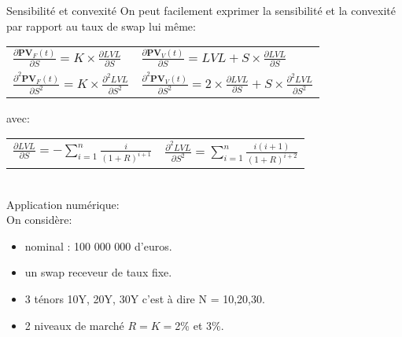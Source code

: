 \documentclass{beamer}
\begin{document}
\begin{frame}{Sensibilité et convexité}
On peut facilement exprimer la sensibilité et la convexité par rapport au taux de swap lui même:\\
\begin{center}
\begin{tabular}{ l l}
$\frac{\partial \textbf{PV}_F(t)}{\partial S}=K \times \frac{\partial LVL}{\partial S} $&
$\frac{\partial \textbf{PV}_V(t)}{\partial S}=LVL+S \times \frac{\partial LVL}{\partial S} $\\
$\frac{\partial^2 \textbf{PV}_F(t)}{\partial S^2}=K \times \frac{\partial^2 LVL}{\partial S^2} $&
$\frac{\partial^2 \textbf{PV}_V(t)}{\partial S^2}=2 \times \frac{\partial LVL}{\partial S} + S \times \frac{\partial^2 LVL}{\partial S^2}$\\
\end{tabular}
\end{center}
avec:\\
\vspace{0.5cm}
\begin{tabular}{c c}
$\frac{\partial LVL}{\partial S}=-\sum_{i=1}^{n} \frac{i}{(1+R)^{i+1}}$&
$\frac{\partial^2 LVL}{\partial S^2}=\sum_{i=1}^{n} \frac{i(i+1)}{(1+R)^{i+2}}$
\end{tabular}\\
\vspace{0.5cm}
Application numérique:\\
On considère:
\begin{itemize}
\item nominal : 100 000 000 d'euros.\\
\item un swap receveur de taux fixe.
\item 3 ténors 10Y, 20Y, 30Y c'est à dire N = 10,20,30.
\item 2 niveaux de marché $R=K=$2\% et 3\%.
\end{itemize}
\end{frame}
\end{document}

